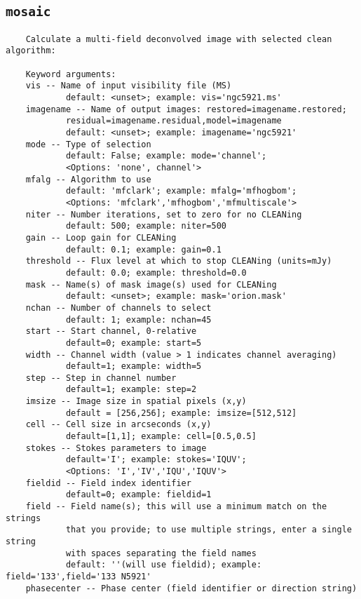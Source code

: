 \subsection{{\tt mosaic}}
\label{section:tasks.mosaic}

\small
\begin{verbatim}
    Calculate a multi-field deconvolved image with selected clean algorithm:
    
    Keyword arguments:
    vis -- Name of input visibility file (MS)
            default: <unset>; example: vis='ngc5921.ms'
    imagename -- Name of output images: restored=imagename.restored;
            residual=imagename.residual,model=imagename
            default: <unset>; example: imagename='ngc5921'
    mode -- Type of selection 
            default: False; example: mode='channel'; 
            <Options: 'none', channel'>
    mfalg -- Algorithm to use
            default: 'mfclark'; example: mfalg='mfhogbom'; 
            <Options: 'mfclark','mfhogbom','mfmultiscale'>
    niter -- Number iterations, set to zero for no CLEANing
            default: 500; example: niter=500
    gain -- Loop gain for CLEANing
            default: 0.1; example: gain=0.1
    threshold -- Flux level at which to stop CLEANing (units=mJy)
            default: 0.0; example: threshold=0.0
    mask -- Name(s) of mask image(s) used for CLEANing
            default: <unset>; example: mask='orion.mask'
    nchan -- Number of channels to select
            default: 1; example: nchan=45
    start -- Start channel, 0-relative
            default=0; example: start=5
    width -- Channel width (value > 1 indicates channel averaging)
            default=1; example: width=5
    step -- Step in channel number
            default=1; example: step=2      
    imsize -- Image size in spatial pixels (x,y)
            default = [256,256]; example: imsize=[512,512]
    cell -- Cell size in arcseconds (x,y)
            default=[1,1]; example: cell=[0.5,0.5]
    stokes -- Stokes parameters to image
            default='I'; example: stokes='IQUV'; 
            <Options: 'I','IV','IQU','IQUV'>
    fieldid -- Field index identifier
            default=0; example: fieldid=1
    field -- Field name(s); this will use a minimum match on the strings
            that you provide; to use multiple strings, enter a single string
            with spaces separating the field names
            default: ''(will use fieldid); example: field='133',field='133 N5921'
    phasecenter -- Phase center (field identifier or direction string)

\end{verbatim}
